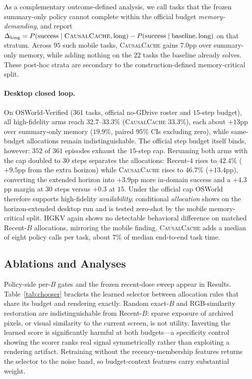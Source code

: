 \documentclass[letterpaper]{article} %
\newcommand{\method}{\textsc{CausalCache}}
\newcommand{\hgkv}{\textsc{HGKV}}
\begin{document}
As a complementary outcome-defined analysis, we call tasks that the frozen
summary-only policy cannot complete within the official budget
\emph{memory-demanding}, and report
$\Delta_{\text{long}}=P(\text{success}\mid\text{\method},\text{long})-P(\text{success}\mid\text{baseline},\text{long})$
on that stratum. Across $95$ such mobile tasks, \method{} gains
$7.0$pp over summary-only memory, while adding nothing on the $22$ tasks
the baseline already solves. These post-hoc strata are secondary to the construction-defined
memory-critical split.

\paragraph{Desktop closed loop.}
On OSWorld-Verified (361 tasks, official no-GDrive roster and
$15$-step budget), all high-fidelity arms reach $32.7$--$33.3\%$
(\method{} $33.3\%$), each
about $+13$pp over summary-only memory ($19.9\%$, paired $95\%$ CIs
excluding zero), while same-budget allocations remain
indistinguishable. The official step budget itself binds, however:
$352$ of $361$ episodes exhaust the $15$-step cap. Rerunning both arms
with the cap doubled to $30$ steps separates the allocations: Recent-$4$
rises to $42.4\%$ ($+9.5$pp from the extra horizon) while \method{}
rises to $46.7\%$ ($+13.4$pp), converting the extended horizon into
$+3.9$pp more in-domain success and a $+4.3$pp margin at $30$ steps
versus $+0.3$ at $15$. Under the official cap OSWorld therefore
supports high-fidelity \emph{availability}; conditional
\emph{allocation} shows on the horizon-extended desktop run and is
tested zero-shot by the mobile memory-critical split. \hgkv{} again shows no detectable behavioral difference on matched
Recent-$B$ allocations, mirroring the mobile finding. \method{} adds a
median of eight policy calls per task, about $7\%$ of median end-to-end
task time.

\subsection{Ablations and Analyses}

 Policy-side per-$B$ gates and the frozen recent-dose sweep appear in Results.
Table~\ref{tab:chooser} brackets the learned selector between allocation
rules that share its budget and rendering exactly. Random exact-$B$ and
RGB-similarity restoration are indistinguishable from Recent-$B$: sparse
exposure of archived pixels, or visual similarity to the current screen, is
not utility. Inverting the learned score is significantly harmful at both
budgets---a specificity control showing the scorer ranks real signal
symmetrically rather than exploiting a rendering artifact. Retraining
without the recency-membership features returns the selector to the noise
band, so budget-context features carry substantial weight.
\end{document}
